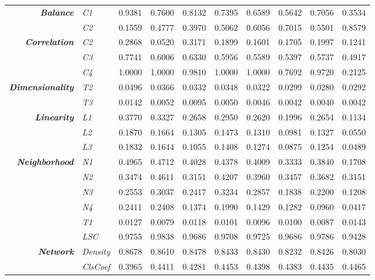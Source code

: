 \begin{center}
\begin{longtable}{ | r  l | c | c | c | c | c | c | c | c | }
\multirow{2}{*}{\emph{\textbf{Balance}}} & \emph{C1} & 
0.9381 & 0.7600 & 0.8132 & 0.7395 & 0.6589 & 0.5642 & 0.7056 & 0.3534 \\ 
& \emph{C2} & 
0.1559 & 0.4777 & 0.3970 & 0.5062 & 0.6056 & 0.7015 & 0.5501 & 0.8579 \\
\hline
\multirow{3}{*}{\emph{\textbf{Correlation}}} & \emph{C2} & 
0.2868 & 0.0520 & 0.3171 & 0.1899 & 0.1601 & 0.1705 & 0.1997 & 0.1241 \\ 
& \emph{C3} & 
0.7741 & 0.6006 & 0.6330 & 0.5956 & 0.5589 & 0.5397 & 0.5737 & 0.4917 \\ 
& \emph{C4} & 
1.0000 & 1.0000 & 0.9810 & 1.0000 & 1.0000 & 0.7692 & 0.9720 & 0.2125 \\
\hline
\multirow{2}{*}{\emph{\textbf{Dimensionality}}} & \emph{T2} & 
0.0496 & 0.0366 & 0.0332 & 0.0348 & 0.0322 & 0.0299 & 0.0280 & 0.0292 \\ 
& \emph{T3} & 
0.0142 & 0.0052 & 0.0095 & 0.0050 & 0.0046 & 0.0042 & 0.0040 & 0.0042 \\ 
\hline
\multirow{3}{*}{\emph{\textbf{Linearity}}} & \emph{L1} & 
0.3770 & 0.3327 & 0.2658 & 0.2950 & 0.2620 & 0.1996 & 0.2654 & 0.1134 \\ 
& \emph{L2} & 
0.1870 & 0.1664 & 0.1305 & 0.1473 & 0.1310 & 0.0981 & 0.1327 & 0.0550 \\ 
& \emph{L3} & 
0.1832 & 0.1644 & 0.1055 & 0.1408 & 0.1274 & 0.0875 & 0.1254 & 0.0489 \\ 
\hline
\multirow{6}{*}{\emph{\textbf{Neighborhood}}} & \emph{N1} & 
0.4965 & 0.4712 & 0.4028 & 0.4378 & 0.4009 & 0.3333 & 0.3840 & 0.1708 \\ 
& \emph{N2} & 
0.3474 & 0.4611 & 0.3151 & 0.4207 & 0.3960 & 0.3457 & 0.3682 & 0.3151 \\ 
& \emph{N3} & 
0.2553 & 0.3037 & 0.2417 & 0.3234 & 0.2857 & 0.1838 & 0.2200 & 0.1208 \\ 
& \emph{N4} & 
0.2411 & 0.2408 & 0.1374 & 0.1990 & 0.1429 & 0.1282 & 0.0960 & 0.0417 \\ 
& \emph{T1} & 
0.0127 & 0.0079 & 0.0118 & 0.0101 & 0.0096 & 0.0100 & 0.0087 & 0.0143 \\ 
& \emph{LSC} & 
0.9755 & 0.9838 & 0.9686 & 0.9708 & 0.9725 & 0.9686 & 0.9786 & 0.9428 \\ 
\hline
\multirow{3}{*}{\emph{\textbf{Network}}} & \emph{Density} & 
0.8678 & 0.8610 & 0.8478 & 0.8433 & 0.8430 & 0.8232 & 0.8426 & 0.8030 \\ 
& \emph{ClsCoef} & 
0.3965 & 0.4411 & 0.4281 & 0.4453 & 0.4398 & 0.4383 & 0.4435 & 0.4465 \\ 

\end{longtable}
\end{center}
